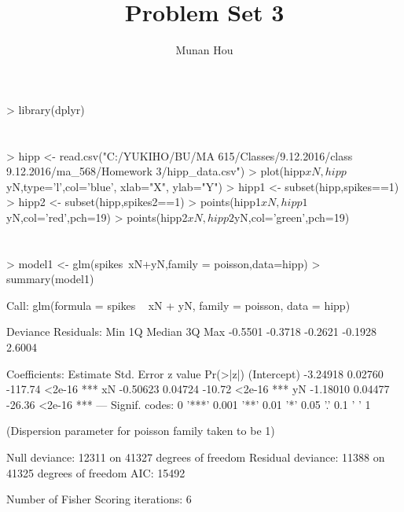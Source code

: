 \documentclass[a4paper]{article}
\title{Problem Set 3}
\author{Munan Hou}
\begin{document}


\maketitle{}

\begin{Schunk}
\begin{Sinput}
> library(dplyr)
\end{Sinput}
\end{Schunk}

\section{}

\begin{Schunk}
\begin{Sinput}
> hipp <- read.csv("C:/YUKIHO/BU/MA 615/Classes/9.12.2016/class 9.12.2016/ma_568/Homework 3/hipp_data.csv")
> plot(hipp$xN,hipp$yN,type='l',col='blue', xlab="X", ylab="Y")
> hipp1 <- subset(hipp,spikes==1)
> hipp2 <- subset(hipp,spikes2==1)
> points(hipp1$xN,hipp1$yN,col='red',pch=19)
> points(hipp2$xN,hipp2$yN,col='green',pch=19)
\end{Sinput}
\end{Schunk}



\section{}

\begin{Schunk}
\begin{Sinput}
> model1 <- glm(spikes~xN+yN,family = poisson,data=hipp)
> summary(model1)
\end{Sinput}
\begin{Soutput}
Call:
glm(formula = spikes ~ xN + yN, family = poisson, data = hipp)

Deviance Residuals: 
    Min       1Q   Median       3Q      Max  
-0.5501  -0.3718  -0.2621  -0.1928   2.6004  

Coefficients:
            Estimate Std. Error z value Pr(>|z|)    
(Intercept) -3.24918    0.02760 -117.74   <2e-16 ***
xN          -0.50623    0.04724  -10.72   <2e-16 ***
yN          -1.18010    0.04477  -26.36   <2e-16 ***
---
Signif. codes:  0 '***' 0.001 '**' 0.01 '*' 0.05 '.' 0.1 ' ' 1

(Dispersion parameter for poisson family taken to be 1)

    Null deviance: 12311  on 41327  degrees of freedom
Residual deviance: 11388  on 41325  degrees of freedom
AIC: 15492

Number of Fisher Scoring iterations: 6
\end{Soutput}
\end{Schunk}
\end{document}
